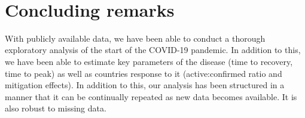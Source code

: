 \documentclass[8pt]{article}
\begin{document}
    \begin{center}
    \end{center}
    { \hspace*{\fill} \\}
    
    \section{Concluding remarks}
With publicly available data, we have been able to conduct a thorough exploratory analysis of the start of the COVID-19 pandemic. In addition to this, we have been able to estimate key parameters of the disease (time to recovery, time to peak) as well as countries response to it (active:confirmed ratio and mitigation effects). In addition to this, our analysis has been structured in a manner that it can be continually repeated as new data becomes available. It is also robust to missing data.

    
    
    
\end{document}
